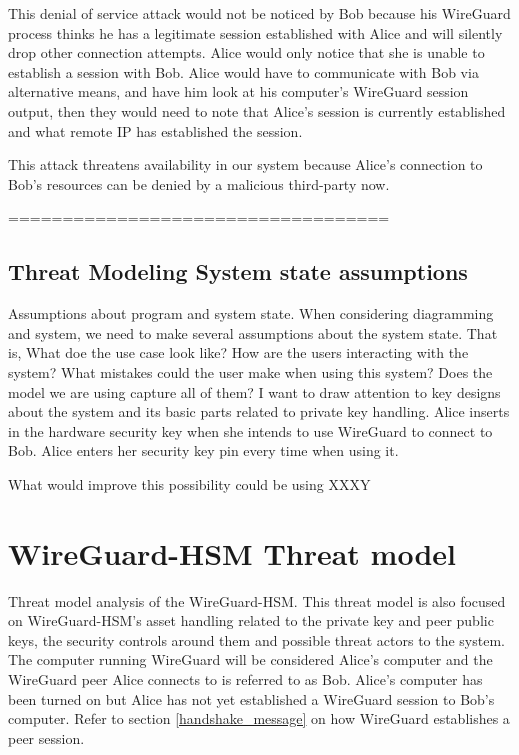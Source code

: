 \documentclass [11pt, proquest] {uwthesis}[2020/02/24]
\begin{document}
This denial of service attack would not be noticed by Bob because his WireGuard process thinks he has a legitimate session established with Alice and will silently drop other connection attempts. Alice would only notice that she is unable to establish a session with Bob. Alice would have to communicate with Bob via alternative means, and have him look at his computer's WireGuard session output, then they would need to note that Alice's session is currently established and what remote IP has established the session.

This attack threatens availability in our system because Alice's connection to Bob's resources can be denied by a malicious third-party now.

===================================

\subsection{Threat Modeling System state assumptions}
Assumptions about program and system state. When considering diagramming and system, we need to make several assumptions about the system state. That is, What doe the use case look like? How are the users interacting with the system? What mistakes could the user make when using this system? Does the model we are using capture all of them?
I want to draw attention to key designs about the system and its basic parts related to private key handling.
Alice inserts in the hardware security key when she intends to use WireGuard to connect to Bob. Alice enters her security key pin every time when using it. 

    What would improve this possibility could be using 
XXXY

\section{WireGuard-HSM Threat model}
\label{wg-hsm-analysis}
Threat model analysis of the WireGuard-HSM. This threat model is also focused on WireGuard-HSM's asset handling related to the private key and peer public keys, the security controls around them and possible threat actors to the system. The computer running WireGuard will be considered Alice's computer and the WireGuard peer Alice connects to is referred to as Bob. Alice's computer has been turned on but Alice has not yet established a WireGuard session to Bob's computer. Refer to section \ref{handshake_message} on how WireGuard establishes a peer session. 
\end{document}
